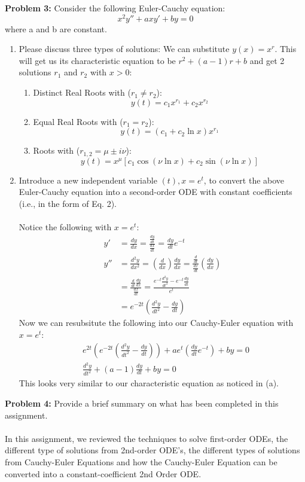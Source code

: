 \documentclass[11pt]{article}
\newenvironment{problem}[1]{\textbf{Problem #1: }}{\newpage}
\begin{document}
	\begin{problem}{3}
		Consider the following Euler-Cauchy equation:
		$$x^2y'' + axy' + by = 0 $$
		where a and b are constant.
		\begin{enumerate}[label = (\alph*)]
			\item  Please discuss three types of solutions:
			We can substitute $y(x) = x^r$.  This will get us its characteristic equation to be $r^2 + (a-1)r + b$ and get 2 solutions $r_1$ and $r_2$ with $x > 0$:
				\begin{enumerate}[label = (\roman*)]
					\item Distinct Real Roots with ($r_1 \not = r_2$):
					$$y(t) = c_1x^{r_1} + c_2x^{r_2}$$
					\item Equal Real Roots with ($r_1 = r_2$):
					$$y(t) = (c_1 + c_2\ln x)x^{r_1}$$
					\item Roots with ($r_{1,2} = \mu \pm i\nu$):
					$$y(t) = x^\mu \left[c_1 \cos(\nu \ln x) + c_2 \sin (\nu \ln x)\right]$$
				\end{enumerate} 
			\item Introduce a new independent variable $(t), x = e^t$, to convert the above 
			Euler-Cauchy equation into a second-order ODE with constant coefficients (i.e., in the form of Eq. 2).
			\\ \\
			Notice the following with $x = e^t$:
				\begin{align*}
					y' &= \frac{dy}{dx} = \frac{\frac{dy}{dt}}{\frac{dx}{dt}} = \frac{dy}{dt}e^{-t} \\
					y'' &= \frac{d^2y}{dx^2} = \left(\frac{d}{dx}\right) \frac{dy}{dx} = \frac{\frac{d}{dt}}{ \frac{dx}{dt}}\left(\frac{dy}{dx}\right) \\
					&= \frac{\frac{d}{dt} \frac{dy}{dx}}{\frac{dx}{dt}} = \frac{e^{-t}\frac{d^2y}{dt^2} - e^{-t}\frac{dy}{dt}}{e^t} \\
					&= e^{-2t}\left(\frac{d^2y}{dt^2} - \frac{dy}{dt}\right)
				\end{align*}
			Now we can resubsitute the following into our Cauchy-Euler equation with $x = e^t$:
				\begin{align*}
					&e^{2t}\left(e^{-2t}\left(\frac{d^2y}{dt^2} - \frac{dy}{dt}\right)\right) + ae^t\left(\frac{dy}{dt}e^{-t}\right) + by = 0 \\
					&\frac{d^2y}{dt^2} + (a-1)\frac{dy}{dt} + by = 0
				\end{align*}
			This looks very similar to our characteristic equation as noticed in (a).
		\end{enumerate}
	\end{problem}

	\begin{problem}{4}
		Provide a brief summary on what has been completed in this
		assignment.
		\\ \\
		In this assignment, we reviewed the techniques to solve first-order ODEs, the different type of solutions from 2nd-order ODE's, the different types of solutions from Cauchy-Euler Equations and how the Cauchy-Euler Equation can be converted into a constant-coefficient 2nd Order ODE.
	\end{problem}
\end{document}
